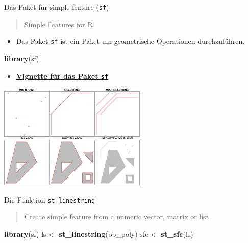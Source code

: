 \documentclass[ignorenonframetext,]{beamer}
\newenvironment{Shaded}{\begin{snugshade}}{\end{snugshade}}
\newcommand{\KeywordTok}[1]{\textcolor[rgb]{0.13,0.29,0.53}{\textbf{#1}}}
\newcommand{\StringTok}[1]{\textcolor[rgb]{0.31,0.60,0.02}{#1}}
\newcommand{\NormalTok}[1]{#1}
\providecommand{\tightlist}{%
  \setlength{\itemsep}{0pt}\setlength{\parskip}{0pt}}
\begin{document}
\begin{frame}[fragile]{Das Paket für simple feature (\texttt{sf})}

\begin{quote}
Simple Features for R
\end{quote}

\begin{itemize}
\tightlist
\item
  Das Paket \texttt{sf} ist ein Paket um geometrische Operationen
  durchzuführen.
\end{itemize}

\begin{Shaded}
\begin{Highlighting}[]
\KeywordTok{library}\NormalTok{(sf)}
\end{Highlighting}
\end{Shaded}

\begin{itemize}
\tightlist
\item
  \href{https://cran.r-project.org/web/packages/sf/vignettes/sf3.html}{\textbf{Vignette
  für das Paket \texttt{sf}}}
\end{itemize}

\includegraphics{figure/rsimplefeatures.png}

\end{frame}

\begin{frame}[fragile]{Die Funktion \texttt{st\_linestring}}

\begin{quote}
Create simple feature from a numeric vector, matrix or list
\end{quote}

\begin{Shaded}
\begin{Highlighting}[]
\KeywordTok{library}\NormalTok{(sf)}
\NormalTok{ls <-}\StringTok{ }\KeywordTok{st_linestring}\NormalTok{(bb_poly)}
\NormalTok{sfc <-}\StringTok{ }\KeywordTok{st_sfc}\NormalTok{(ls)}
\end{Highlighting}
\end{Shaded}

\end{frame}
\end{document}
